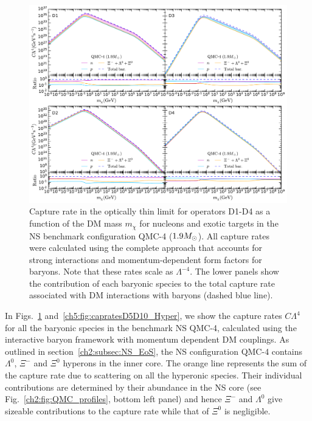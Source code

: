 \begin{figure}[t!bp] 
\centering
\includegraphics[width=\textwidth]{capture_3/D1_D4_C_mDM_hyper_meff_ratio.pdf}
\caption[Capture rate in the optically thin limit for operators D1-D4 as a function of the DM mass $m_\chi$ for nucleons and exotic targets in the NS benchmark configuration QMC-4 ($1.9\Msun$).]{Capture rate in the optically thin limit for operators D1-D4 as a function of the DM mass $m_\chi$ for nucleons and exotic targets in the NS benchmark configuration QMC-4 ($1.9\Msun$). All capture rates were calculated using the complete approach that accounts for strong interactions and momentum-dependent form factors for baryons. Note that these rates scale as $\Lambda^{-4}$. The lower panels show the contribution of each baryonic species to the total capture rate associated with DM interactions with baryons (dashed blue line). 
}
\label{ch5:fig:capratesD1D4_Hyper}
\end{figure}  



In Figs.~\ref{ch5:fig:capratesD1D4_Hyper} and~\ref{ch5:fig:capratesD5D10_Hyper}, we show the capture rates $C \Lambda^4$ for all the baryonic species in the benchmark NS QMC-4, calculated using the interactive baryon framework with momentum dependent DM couplings. As outlined in section~\ref{ch2:subsec:NS_EoS}, the NS configuration QMC-4 contains $\Lambda^0$, $\Xi^-$ and $\Xi^0$ hyperons in the inner core.  
The orange line represents the sum of the capture rate due to scattering on all the hyperonic species. Their individual contributions are determined by their abundance in the NS core (see Fig.~\ref{ch2:fig:QMC_profiles}, bottom left panel) and hence $\Xi^-$ and $\Lambda^0$ give sizeable contributions to the capture rate while that of $\Xi^0$ is negligible. 



